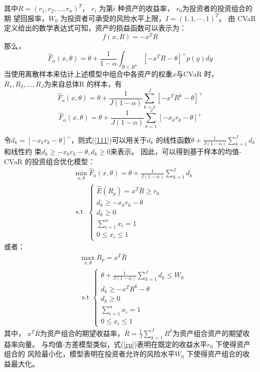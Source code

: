 \documentclass[withoutpreface,bwprint]{cumcmthesis} %
\begin{document}
其中$R=\left(r_{1}, r_{2}, \ldots, r_{n}\right)^{T}$， $r_i$ 为第$i$ 种资产的收益率， $r_0$为投资者的投资组合的期
望回报率，$W_0$ 为投资者可承受的风险水平上限，$I=(1,1, \cdots, 1)^{T}$。
由 CVaR 定义给出的数学表达式可知，资产的损益函数可以表示为：
$$
f(x, R)=-x^{T} R
$$
那么，
$$
\hat{F}_{\alpha}(x, \theta)=\theta+\frac{1}{1-\alpha} \int_{R \in R^{n}}\left[-x^{T} R-\theta\right]^{+} p(y) d y
$$
当使用离散样本来估计上述模型中组合中各资产的权重$x $与CVaR 时，
$R_{1}, R_{2}, \ldots, R_{J}$为来自总体R 的样本，有
$$\hat{F}_{a}(x, \theta)=\theta+\frac{1}{J(1-\alpha)} \sum_{k=1}^{J}\left[-x^{T} R^{k}-\theta\right]^{+}$$
\begin{equation}\label{111}
\hat{F}_{\alpha}(x, \theta)=\theta+\frac{1}{J(1-\alpha)} \sum_{k=1}^{J}\left[-x_{k} r_{k}-\theta\right]^{+}
\end{equation}

令$d_{k}=\left[-x_{k} r_{k}-\theta\right]^{+}$，则式(\ref{111})可以用关于$d_k$ 的线性函数$\theta+\frac{1}{J(1-\alpha)} \sum_{k=1}^{J} d_{k}$和线性约
束$d_{k} \geq-x_{k} r_{k}-\theta, d_{k} \geq 0$来表示。
因此，可以得到基于样本的均值-CVaR 的投资组合优化模型：
\begin{equation}
\begin{aligned}
&\min _{x, \theta} \hat{F}_{a}(x, \theta)=\theta+\frac{1}{J(1-\alpha)} \sum_{k=1}^{J} d_{k} \\
&\text { s.t. }\left\{\begin{array}{l}
\hat{E}\left(R_{p}\right)=x^{T} \bar{R} \geq r_{0} \\
d_{k} \geq-x_{k} r_{k}-\theta \\
d_{k} \geq 0 \\
\sum_{i=1}^{n} x_{i}=1 \\
0 \leq x_{i} \leq 1
\end{array}\right.
\end{aligned}
\end{equation}
或者：
\begin{equation}
\begin{aligned}
&\max _{x, \theta} R_{p}=x^{T} \bar{R} \\
&\text { s.t }\left\{\begin{array}{l}
\theta+\frac{1}{J(1-\alpha)} \sum_{k=1}^{J} d_{k} \leq W_{0} \\
d_{k} \geq-x^{T} R^{k}-\theta \\
d_{k} \geq 0 \\
\sum_{i=1}^{n} x_{i}=1 \\
0 \leq x_{i} \leq 1
\end{array}\right.
\end{aligned}
\label{rp}
\end{equation}
其中， $x^{T} \bar{R}$为资产组合的期望收益率，$\bar{R}=\frac{1}{J} \sum_{k=1}^{J} R^{k}$为资产组合资产的期望收益率向量。
与均值-方差模型类似，式(\ref{rp})表明在既定的收益水平$r_0$ 下使得资产组合的
风险最小化，模型表明在投资者允许的风险水平$W_0$ 下使得资产组合的收益最大化。
\end{document}
